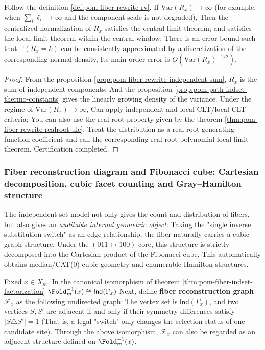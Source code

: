 

\begin{corollary}\label{cor:pom-fiber-rewrite-local-clt}
Follow the definition \ref{def:pom-fiber-rewrite-rv}.
If \(\mathrm{Var}(R_x)\to\infty\) (for example, when \(\sum_i \ell_i\to\infty\) and the component scale is not degraded),
Then the centralized normalization of \(R_x\) satisfies the central limit theorem; and satisfies the local limit theorem within the central window:
There is an error bound such that \(\mathbb P(R_x=k)\) can be consistently approximated by a discretization of the corresponding normal density,
Its main-order error is \(O(\mathrm{Var}(R_x)^{-1/2})\).
\end{corollary}
\begin{proof}
From the proposition \ref{prop:pom-fiber-rewrite-independent-sum}, \(R_x\) is the sum of independent components;
And the proposition \ref{prop:pom-path-indset-thermo-constants} gives the linearly growing density of the variance.
Under the regime of \(\mathrm{Var}(R_x)\to\infty\),
Can apply independent and local CLT/local CLT criteria;
You can also use the real root property given by the theorem \ref{thm:pom-fiber-rewrite-realroot-ulc},
Treat the distribution as a real root generating function coefficient and call the corresponding real root polynomial local limit theorem.
Certification completed.
\end{proof}

\subsubsection{Fiber reconstruction diagram and Fibonacci cube: Cartesian decomposition, cubic facet counting and Gray--Hamilton structure}\label{subsubsec:pom-fiber-reconstruction-cubical}

The independent set model not only gives the count and distribution of fibers, but also gives an \emph{auditable internal geometric object}:
Taking the "single inverse substitution switch" as an edge relationship, the fiber naturally carries a cubic graph structure.
Under the \((011\leftrightarrow 100)\) core, this structure is strictly decomposed into the Cartesian product of the Fibonacci cube,
This automatically obtains median/CAT(0) cubic geometry and enumerable Hamilton structures.

\begin{definition}\label{def:pom-fiber-reconstruction-graph}
Fixed \(x\in X_m\). In the canonical isomorphism of theorem \ref{thm:pom-fiber-indset-factorization}
\(\Fold_m^{-1}(x)\cong \mathsf{Ind}(\Gamma_x)\)
Next, define \textbf{fiber reconstruction graph} \(\mathcal F_x\) as the following undirected graph:
The vertex set is \(\mathsf{Ind}(\Gamma_x)\), and two vertices \(S,S'\) are adjacent if and only if their symmetry differences satisfy
\(
|S\triangle S'|=1
\)
(That is, a legal "switch" only changes the selection status of one candidate site).
Through the above isomorphism, \(\mathcal F_x\) can also be regarded as an adjacent structure defined on \(\Fold_m^{-1}(x)\).
\end{definition}

